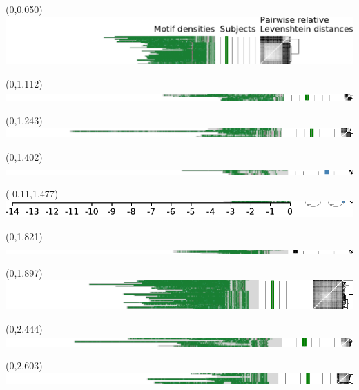 \documentclass{article}
\begin{document}
\begin{textblock}{13}(0,0.050)\includegraphics{./Figure_S4/chr2-HG002.pdf}\end{textblock}
\begin{textblock}{13}(0,1.112)\includegraphics{./Figure_S4/chr2-HG003.pdf}\end{textblock}
\begin{textblock}{13}(0,1.243)\includegraphics{./Figure_S4/chr2-HG004.pdf}\end{textblock}
\begin{textblock}{13}(0,1.402)\includegraphics{./Figure_S4/chr2-HG005.pdf}\end{textblock}
\begin{textblock}{13}(-0.11,1.477)\includegraphics{./Figure_S4/chr2-HG007.pdf}\end{textblock}
\begin{textblock}{13}(0,1.821)\includegraphics{./Figure_S4/3ptel_1-500K_1_12_12-HG001.pdf}\end{textblock}
\begin{textblock}{13}(0,1.897)\includegraphics{./Figure_S4/3ptel_1-500K_1_12_12-HG002.pdf}\end{textblock}
\begin{textblock}{13}(0,2.444)\includegraphics{./Figure_S4/3ptel_1-500K_1_12_12-HG003.pdf}\end{textblock}
\begin{textblock}{13}(0,2.603)\includegraphics{./Figure_S4/3ptel_1-500K_1_12_12-HG004.pdf}\end{textblock}
\end{document}
